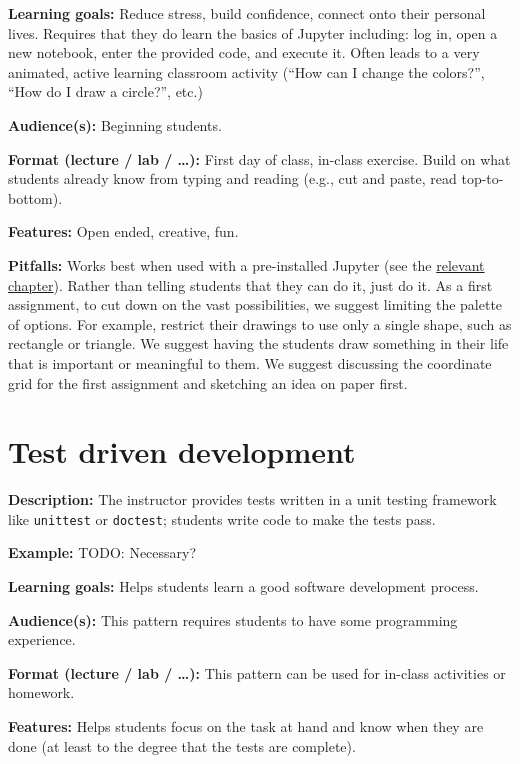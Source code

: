 \documentclass[]{book}
\begin{document}
\textbf{Learning goals:}
Reduce stress, build confidence, connect onto their personal lives. Requires that they
do learn the basics of Jupyter including: log in, open a new notebook, enter the provided code,
and execute it. Often leads to a very animated, active learning classroom activity
(``How can I change the colors?'', ``How do I draw a circle?'', etc.)

\textbf{Audience(s):}
Beginning students.

\textbf{Format (lecture / lab / \ldots):}
First day of class, in-class exercise. Build on what students already know from
typing and reading (e.g., cut and paste, read top-to-bottom).

\textbf{Features:}
Open ended, creative, fun.

\textbf{Pitfalls:}
Works best when used with a pre-installed Jupyter (see the \protect\hyperlink{jupyter}{relevant chapter}).
Rather than telling students that they can do it, just do it. As a
first assignment, to cut down on the vast possibilities, we suggest
limiting the palette of options. For example, restrict their drawings
to use only a single shape, such as rectangle or triangle. We suggest
having the students draw something in their life that is important or
meaningful to them. We suggest discussing the coordinate grid for the
first assignment and sketching an idea on paper first.

\hypertarget{test-driven-development}{%
\section{Test driven development}\label{test-driven-development}}

\textbf{Description:}
The instructor provides tests written in a unit testing framework like \texttt{unittest} or \texttt{doctest};
students write code to make the tests pass.

\textbf{Example:}
TODO: Necessary?

\textbf{Learning goals:}
Helps students learn a good software development process.

\textbf{Audience(s):}
This pattern requires students to have some programming experience.

\textbf{Format (lecture / lab / \ldots):}
This pattern can be used for in-class activities or homework.

\textbf{Features:}
Helps students focus on the task at hand and know when they are done (at least
to the degree that the tests are complete).
\end{document}
